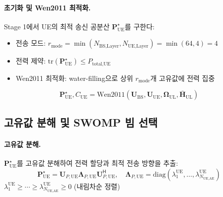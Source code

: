 \documentclass[10pt]{article}
\begin{document}
\paragraph{초기화 및 Wen2011 최적화.}
Stage 1에서 UE의 최적 송신 공분산 $\mathbf{P}_{\text{UE}}^{\star}$를 구한다:
\begin{itemize}
    \item 전송 모드: $r_{\text{mode}} = \min(N_{\text{BS,Layer}}, N_{\text{UE,Layer}}) = \min(64, 4) = 4$
    \item 전력 제약: $\text{tr}(\mathbf{P}_{\text{UE}}^{\star}) \leq P_{\text{total,UE}}$
    \item Wen2011 최적화: water-filling으로 상위 $r_{\text{mode}}$개 고유값에 전력 집중
\end{itemize}

\begin{equation}
\mathbf{P}_{\text{UE}}^{\star}, C_{\text{UE}} = \text{Wen2011}(\mathbf{U}_{\text{BS}}, \mathbf{U}_{\text{UE}}, \boldsymbol{\Omega}_{\text{UL}}, \bar{\mathbf{H}}_{\text{UL}})
\end{equation}

\subsection{고유값 분해 및 SWOMP 빔 선택}

\paragraph{고유값 분해.}
$\mathbf{P}_{\text{UE}}^{\star}$를 고유값 분해하여 전력 할당과 최적 전송 방향을 추출:
\begin{equation}
\mathbf{P}_{\text{UE}}^{\star} = \mathbf{U}_{P,\text{UE}} \boldsymbol{\Lambda}_{P,\text{UE}} \mathbf{U}_{P,\text{UE}}^{\mathsf{H}}, \quad \boldsymbol{\Lambda}_{P,\text{UE}} = \text{diag}(\lambda_1^{\text{UE}}, \ldots, \lambda_{N_{\text{UE,AE}}}^{\text{UE}})
\end{equation}
$\lambda_1^{\text{UE}} \geq \cdots \geq \lambda_{N_{\text{UE,AE}}}^{\text{UE}} \geq 0$ (내림차순 정렬)
\end{document}
